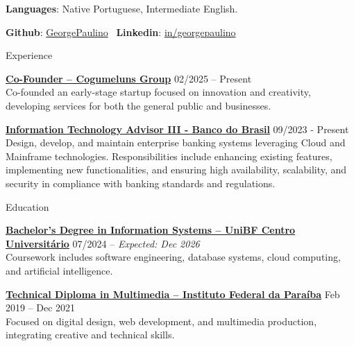 \documentclass{resume}
\begin{document}
\textbf{Languages}: Native Portuguese, Intermediate English.

\textbf{Github}: \href{https://github.com/GeorgePaulino}{GeorgePaulino} \ 
\textbf{Linkedin}:  \href{https://www.linkedin.com/in/georgepaulino/}{in/georgepaulino}



\begin{rSection}{Experience}
    \item \textbf{\href{https://www.cogumeluns.com/}{Co-Founder – Cogumeluns Group}} \hfill 02/2025 – Present \\
    Co-founded an early-stage startup focused on innovation and creativity, developing services for both the general public and businesses.

    \item \textbf{\href{https://www.bb.com.br/site/}{Information Technology Advisor III - Banco do Brasil}} \hfill 09/2023 - Present \\
    Design, develop, and maintain enterprise banking systems leveraging Cloud and Mainframe technologies. Responsibilities include enhancing existing features, implementing new functionalities, and ensuring high availability, scalability, and security in compliance with banking standards and regulations.
\end{rSection} 


\begin{rSection}{Education}
    \item \textbf{\href{https://www.unibf.com.br/}{Bachelor’s Degree in Information Systems – UniBF Centro Universitário}} \hfill {07/2024 –  \emph{Expected: Dec 2026}} \\
    Coursework includes software engineering, database systems, cloud computing, and artificial intelligence.

    \item \textbf{\href{https://www.ifpb.edu.br/}{Technical Diploma in Multimedia – Instituto Federal da Paraíba}} \hfill {Feb 2019 – Dec 2021} \\
    Focused on digital design, web development, and multimedia production, integrating creative and technical skills.
\end{rSection}
\end{document}
